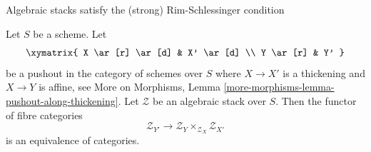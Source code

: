 \begin{lemma}
\label{lemma-pushout}
\begin{slogan}
Algebraic stacks satisfy the (strong) Rim-Schlessinger condition
\end{slogan}
Let $S$ be a scheme. Let
$$
\xymatrix{
X \ar[r] \ar[d] & X' \ar[d] \\
Y \ar[r] & Y'
}
$$
be a pushout in the category of schemes over $S$ where $X \to X'$
is a thickening and $X \to Y$ is affine, see
More on Morphisms, Lemma \ref{more-morphisms-lemma-pushout-along-thickening}.
Let $\mathcal{Z}$ be an algebraic stack over $S$.
Then the functor of fibre categories
$$
\mathcal{Z}_{Y'}
\longrightarrow
\mathcal{Z}_Y \times_{\mathcal{Z}_X} \mathcal{Z}_{X'}
$$
is an equivalence of categories.
\end{lemma}

